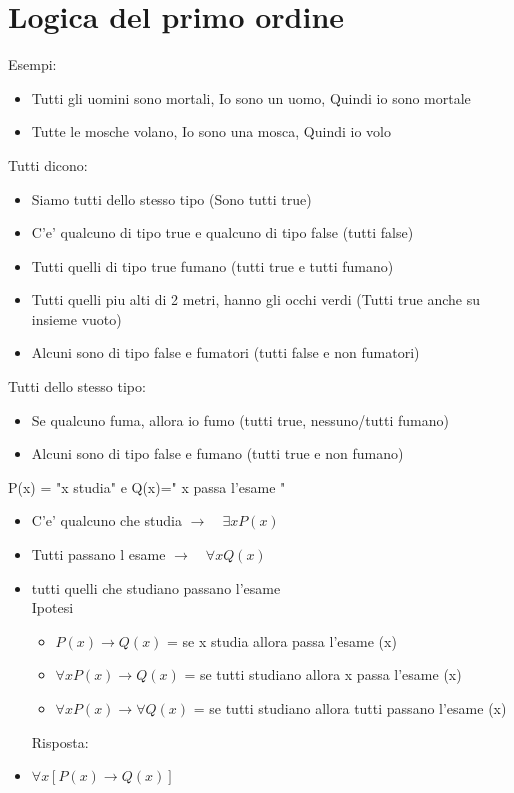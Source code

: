 \documentclass{article}
\begin{document}
        \section{Logica del primo ordine}
        \begin{flushleft}
          Esempi:
          \begin{itemize}
            \item Tutti gli uomini sono mortali, Io sono un uomo, Quindi io sono mortale
            \item Tutte le mosche volano, Io sono una mosca, Quindi io volo
          \end{itemize}
          Tutti dicono:
          \begin{itemize}
            \item Siamo tutti dello stesso tipo (Sono tutti true)
            \item C'e' qualcuno di tipo true e qualcuno di tipo false (tutti false)
            \item Tutti quelli di tipo true fumano (tutti true e tutti fumano)
            \item Tutti quelli piu alti di 2 metri, hanno gli occhi verdi (Tutti true anche su insieme vuoto)
            \item Alcuni sono di tipo false e fumatori (tutti false e non fumatori)
          \end{itemize}
          Tutti dello stesso tipo:
          \begin{itemize}
            \item Se qualcuno fuma, allora io fumo (tutti true, nessuno/tutti fumano)
            \item Alcuni sono di tipo false e fumano (tutti true e non fumano)
          \end{itemize}
          P(x) = "x studia"  e Q(x)=" x passa l'esame "
          \begin{itemize}
            \item C'e' qualcuno che studia $\to \quad \exists xP(x)$
            \item Tutti passano l esame $\to \quad \forall xQ(x)$
            \item tutti quelli che studiano passano l'esame \\
                Ipotesi
              \begin{itemize}
              \item $P(x) \to Q(x)$ = se x studia allora passa l'esame (x)
              \item $\forall xP(x) \to Q(x)$ = se tutti studiano allora x passa l'esame (x)
              \item $\forall xP(x) \to \forall Q(x)$ = se tutti studiano allora tutti passano l'esame (x)
              \end{itemize}
              Risposta:
            \item $\forall x [P(x) \to Q(x)]$ 
          \end{itemize}
        \end{flushleft}
\end{document}
